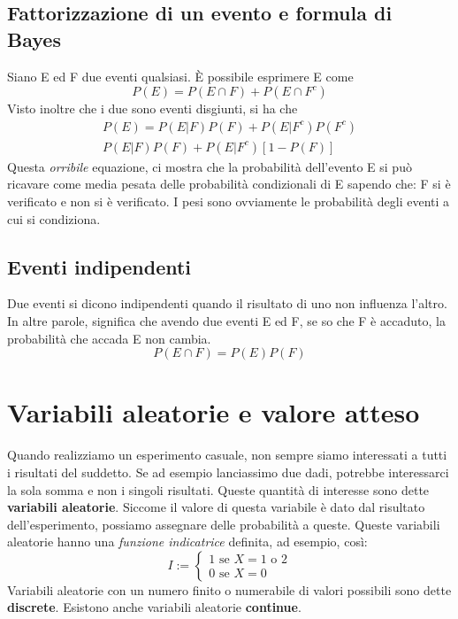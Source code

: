 \documentclass[11pt]{article}
\begin{document}
\subsection{Fattorizzazione di un evento e formula di Bayes}
Siano E ed F due eventi qualsiasi. È possibile esprimere E come
\begin{displaymath}
    P(E) = P(E\cap F) + P(E\cap F^c)
\end{displaymath}
Visto inoltre che i due sono eventi disgiunti, si ha che
\begin{gather*}
    P(E) = P(E|F)P(F) + P(E|F^c)P(F^c)\\
    P(E|F)P(F) + P(E|F^c)[1-P(F)]
\end{gather*}
Questa \textit{orribile} equazione, ci mostra che la probabilità dell'evento E si può ricavare come media pesata delle probabilità condizionali di E sapendo che: F si è verificato e non si è verificato. I pesi sono ovviamente le probabilità degli eventi a cui si condiziona.
\subsection{Eventi indipendenti}
Due eventi si dicono indipendenti quando il risultato di uno non influenza l'altro. In altre parole, significa che avendo due eventi E ed F, se so che F è accaduto, la probabilità che accada E non cambia.
\begin{displaymath}
    P(E\cap F) = P(E) P(F)
\end{displaymath}
\section{Variabili aleatorie e valore atteso}
Quando realizziamo un esperimento casuale, non sempre siamo interessati a tutti i risultati del suddetto. Se ad esempio lanciassimo due dadi, potrebbe interessarci la sola somma e non i singoli risultati. 
Queste quantità di interesse sono dette \textbf{variabili aleatorie}. Siccome il valore di questa variabile è dato dal risultato dell'esperimento, possiamo assegnare delle probabilità a queste. Queste variabili aleatorie hanno una \textit{funzione indicatrice} definita, ad esempio, così:
\begin{displaymath}
    I:=
    \begin{cases}
        1 \mbox{ se } X = 1 \mbox{ o } 2\\
        0 \mbox{ se } X = 0
    \end{cases}
\end{displaymath}
Variabili aleatorie con un numero finito o numerabile di valori possibili sono dette \textbf{discrete}. Esistono anche variabili aleatorie \textbf{continue}.
\end{document}
